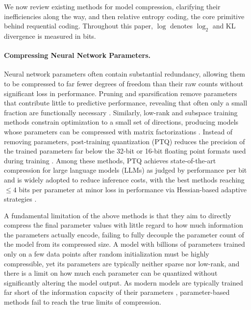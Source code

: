 \documentclass{article}
\theoremstyle{plain}
\theoremstyle{definition}
\theoremstyle{remark}
\begin{document}
 We now review existing methods for model compression, clarifying their inefficiencies along the way, and then relative entropy coding, the core primitive behind requential coding. Throughout this paper, $\log$ denotes $\log_2$ and KL divergence is measured in bits.

\paragraph{Compressing Neural Network Parameters.}
Neural network parameters often contain substantial redundancy, allowing them to be compressed to far fewer degrees of freedom than their raw counts without significant loss in performance. Pruning and sparsification remove parameters that contribute little to predictive performance, revealing that often only a small fraction are functionally necessary \citep{lecun1989optimal,hassibi1993optimal,han2015deep, frankle2018lottery, lee2018snip, gale2019state}. Similarly, low-rank and subspace training methods constrain optimization to a small set of directions, producing models whose parameters can be compressed with matrix factorizations \citep{li2018measuring,lotfi2022pac,hu2022lora}. Instead of removing parameters, post-training quantization (PTQ) reduces the precision of the trained parameters far below the 32-bit or 16-bit floating point formats used during training \citep{han2015deep,nagel2020up,dettmers2022gpt3,frantar2023gptq,lin2024awq}. 
Among these methods, PTQ achieves state-of-the-art compression for large language models (LLMs) as judged by performance per bit and is widely adopted to reduce inference costs, with the best methods reaching $\leq 4$ bits per parameter at minor loss in performance via Hessian-based adaptive strategies \citep{frantar2023gptq,tseng2024quip}. 

A fundamental limitation of the above methods is that they aim to directly compress the final parameter values with little regard to how much information the parameters actually encode, failing to fully decouple the parameter count of the model from its compressed size. A model with billions of parameters trained only on a few data points after random initialization must be highly compressible, yet its parameters are typically neither sparse nor low-rank, and there is a limit on how much each parameter can be quantized without significantly altering the model output. As modern models are typically trained far short of the information capacity of their parameters \citep{kaplan2020scaling, hoffmann2022training}, parameter-based methods fail to reach the true limits of compression.
\end{document}
